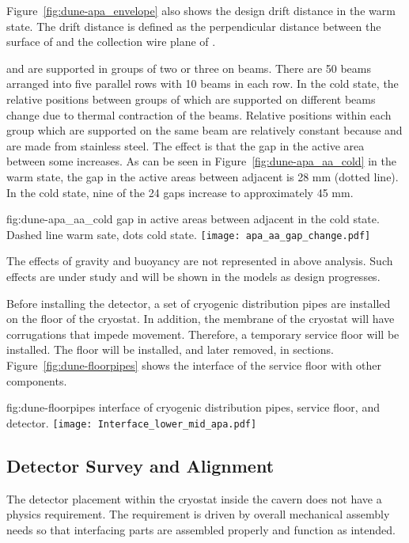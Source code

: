 Figure~\ref{fig:dune-apa_envelope} also shows the design drift distance in
the warm state. The drift distance is defined as the perpendicular
distance between the surface of  and the collection wire
plane of .

 and  are supported in groups of two or three
on  beams. There are 50 beams arranged into five parallel
rows with 10 beams in each row.  In the cold state, the relative
positions between groups of  which are supported on
different beams change due to thermal contraction of the
beams. Relative positions within each group which are supported on the
same beam are relatively constant because  and
 are made from stainless steel.  The effect is that the gap
in the active area between some  increases.  As can be
seen in Figure~\ref{fig:dune-apa_aa_cold} in the warm state, the gap
in the active areas between adjacent  is 28 mm (dotted
line). In the cold state, nine of the 24 gaps increase to
approximately 45 mm.
\begin{dunefigure}{fig:dune-apa_aa_cold} 
    { gap in active areas between adjacent  in the cold state. Dashed line warm sate, dots cold state.}
\texttt{[image: apa\_aa\_gap\_change.pdf]}
\end{dunefigure}

The effects of gravity and buoyancy are not represented in above
analysis. Such effects are under study and will be shown in the models
as design progresses.


Before installing the detector, a set of cryogenic distribution pipes
are installed on the floor of the cryostat. In addition, the membrane
of the cryostat will have corrugations that impede
movement. Therefore, a temporary service floor will be installed. The
floor will be installed, and later removed, in
sections. Figure~\ref{fig:dune-floorpipes} shows the interface of the
service floor with other components.
\begin{dunefigure}{fig:dune-floorpipes} 
{ interface of cryogenic distribution pipes, service floor, and
  detector.}
\texttt{[image: Interface\_lower\_mid\_apa.pdf]}
\end{dunefigure}

\subsection{Detector Survey and Alignment}
\label{sec:fdsp-coord-integ-survey}
The detector placement within the cryostat inside the
cavern does not have a physics requirement. The requirement is driven
by overall mechanical assembly needs so that interfacing
parts are assembled properly and function as intended.


